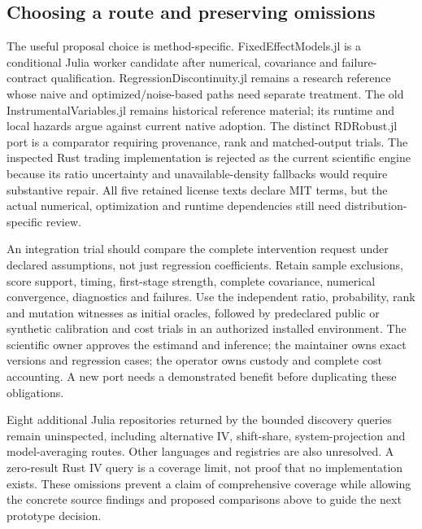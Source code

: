 \subsection{Choosing a route and preserving omissions}
\label{exec23:otheriv-choice}
The useful proposal choice is method-specific. FixedEffectModels.jl is
a conditional Julia worker candidate after numerical, covariance and
failure-contract qualification. RegressionDiscontinuity.jl remains a
research reference whose naive and optimized/noise-based paths need
separate treatment. The old InstrumentalVariables.jl remains historical
reference material; its runtime and local hazards argue against current
native adoption. The distinct RDRobust.jl port is a comparator requiring
provenance, rank and matched-output trials. The inspected Rust trading
implementation is rejected as the current scientific engine because
its ratio uncertainty and unavailable-density fallbacks would require
substantive repair. All five retained license texts declare MIT terms,
but the actual numerical, optimization and runtime dependencies still
need distribution-specific review.
\citep{exec23_otheriv_source_0,exec23_otheriv_source_1,exec23_otheriv_source_2,exec23_otheriv_source_3,exec23_otheriv_source_4}

An integration trial should compare the complete intervention request
under declared assumptions, not just regression coefficients. Retain
sample exclusions, score support, timing, first-stage strength, complete
covariance, numerical convergence, diagnostics and failures. Use the
independent ratio, probability, rank and mutation witnesses as initial
oracles, followed by predeclared public or synthetic calibration and
cost trials in an authorized installed environment. The scientific
owner approves the estimand and inference; the maintainer owns exact
versions and regression cases; the operator owns custody and complete
cost accounting. A new port needs a demonstrated benefit before
duplicating these obligations. \citep{exec23_otheriv_reference}

Eight additional Julia repositories returned by the bounded discovery
queries remain uninspected, including alternative IV, shift-share,
system-projection and model-averaging routes. Other languages and
registries are also unresolved. A zero-result Rust IV query is a
coverage limit, not proof that no implementation exists. These omissions
prevent a claim of comprehensive coverage while allowing the concrete
source findings and proposed comparisons above to guide the next
prototype decision.
